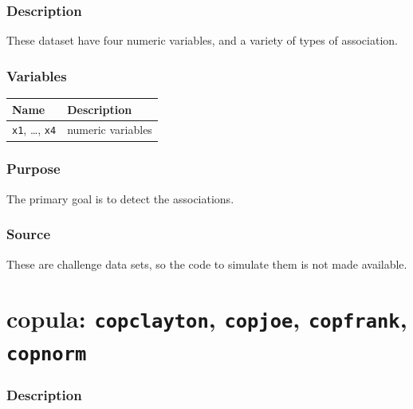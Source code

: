 \documentclass[
  letterpaper,
]{krantz}
\newcounter{none} %
\begin{document}
\subsubsection*{Description}\label{description-12}

These dataset have four numeric variables, and a variety of types of
association.

\subsubsection*{Variables}\label{variables-12}

{\def\LTcaptype{none} %
\begin{longtable}[]{@{}ll@{}}
\toprule\noalign{}
Name & Description \\
\midrule\noalign{}
\endhead
\bottomrule\noalign{}
\endlastfoot
\texttt{x1}, \ldots, \texttt{x4} & numeric variables \\
\end{longtable}
}

\subsubsection*{Purpose}\label{purpose-12}

The primary goal is to detect the associations.

\subsubsection*{Source}\label{source-12}

These are challenge data sets, so the code to simulate them is not made
available.

\section{\texorpdfstring{copula: \texttt{copclayton}, \texttt{copjoe},
\texttt{copfrank},
\texttt{copnorm}}{copula: copclayton, copjoe, copfrank, copnorm}}\label{copula-copclayton-copjoe-copfrank-copnorm}

\subsubsection*{Description}\label{description-13}
\end{document}
